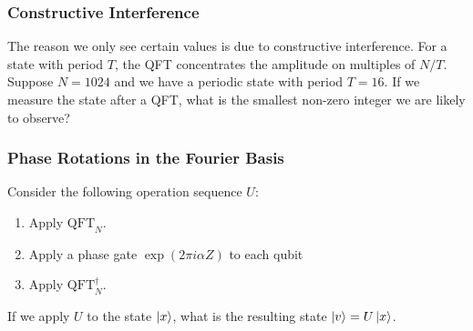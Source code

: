 \subsubsection{Constructive Interference}
The reason we only see certain values is due to constructive interference. For a state with period $T$, the QFT concentrates the amplitude on multiples of $N/T$.\\

Suppose $N = 1024$ and we have a periodic state with period $T=16$. If we measure the state after a QFT, what is the smallest non-zero integer we are likely to observe? \\
\noindent{}

\subsubsection{Phase Rotations in the Fourier Basis}
Consider the following operation sequence $U$:
\begin{enumerate}
    \item Apply $\mathrm{QFT}_N$.
    \item Apply a phase gate $\exp(2\pi i \alpha Z)$ to each qubit
    \item Apply $\mathrm{QFT}^\dagger_N$.
\end{enumerate}
If we apply $U$ to the state $\ket{x}$, what is the resulting state $\ket{v} = U\ket{x}$. \\

